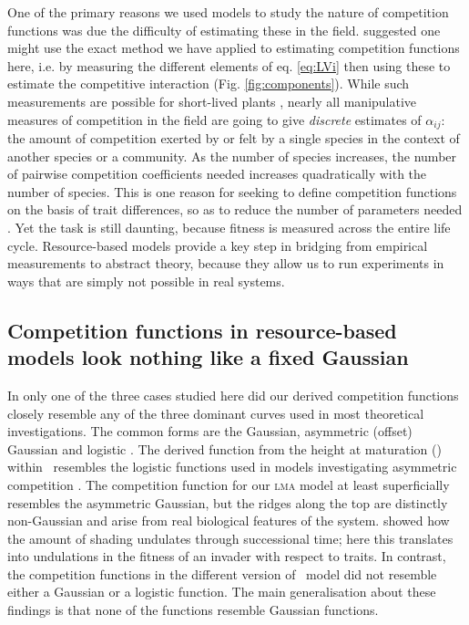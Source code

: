 \documentclass[a4paper,11pt]{article}
\begin{document}
One of the primary reasons we used models to study the nature of
competition functions was due the difficulty of estimating these in
the field. \citet{Ricklefs-1973} suggested one might use
the exact method we have
applied to estimating competition functions here, i.e. by measuring the
different elements of eq. \ref{eq:LVi} then using these to estimate
the competitive interaction (Fig. \ref{fig:components}).  While
such measurements are possible for short-lived plants
\citep{Kraft-2015}, nearly all manipulative measures of competition in
the field are going to give \emph{discrete} estimates of $\alpha_{ij}$: the
amount of competition exerted by or felt by a single species in the
context of another species or a community. As the number of species
increases, the number of pairwise competition coefficients needed
increases quadratically with the number of species. This is one reason
for seeking to define competition functions on the basis of trait
differences, so as to reduce the number of parameters needed
\citep{Kraft-2015}. Yet the task is still daunting, because fitness is measured
across the entire life cycle.  Resource-based models provide a key step in
bridging from empirical measurements to abstract theory, because they
allow us to run experiments in ways that are simply not possible in real systems.

\subsection{Competition functions in resource-based models look nothing like a
fixed Gaussian}

In only one of the three cases studied here did our derived
competition functions closely resemble any of the three dominant
curves used in most theoretical investigations. The common forms are
the Gaussian, asymmetric (offset) Gaussian \citep{Roughgarden-1979}
and logistic \citep[e.g.][]{Kisdi-1999, Law-1997}.  The derived
function from the height at maturation (\hmat) within \plant\
resembles the logistic functions used in models investigating
asymmetric competition \citep{Law-1997, Geritz-1999, Kisdi-1999,
  Calcagno-2006}.
%
The competition function for our \textsc{lma} model
at least superficially resembles the asymmetric Gaussian, but the
ridges along the top are distinctly non-Gaussian and arise from real
biological features of the system.
%
\citet{Falster-2011} showed how the amount of shading undulates
through successional time; here this translates into undulations in
the fitness of an invader with respect to traits.
%
In contrast, the competition functions in the different version of \Rstar\ model did not resemble either a Gaussian or a logistic function.
%
The main generalisation about these findings is that
none of the functions resemble Gaussian functions.
\end{document}
